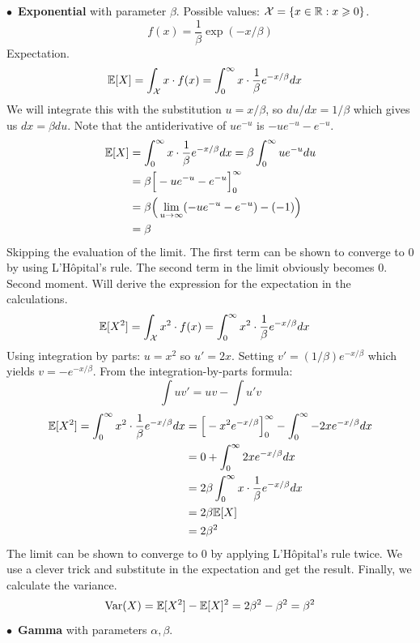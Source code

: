 \newpage\noindent$\bullet$ \textbf{Exponential} with parameter $\beta$. Possible values: $\mathcal{X} = \{x\in\mathbb{R} : x\geqslant0\}$. 
$$
f(x) = \frac{1}{\beta}\exp(-x/\beta)
$$
Expectation.
\begin{align*}
    \mathbb{E}[X] &= \int_{\mathcal{X}} x\cdot f(x) = \int_0^\infty x\cdot \frac{1}{\beta} e^{-x/\beta} dx
\end{align*}
We will integrate this with the substitution $u = x/\beta$, so $du/dx = 1/\beta$ which gives us $dx = \beta du$.
Note that the antiderivative of $ue^{-u}$ is $-ue^{-u} - e^{-u}$.
\begin{align*}
    \mathbb{E}[X] &= \int_0^\infty x\cdot \frac{1}{\beta} e^{-x/\beta} dx
    = \beta\int_0^\infty u e^{-u} du \\
    &= \beta\Big[-ue^{-u} - e^{-u}\Big]_0^\infty \\
    &= \beta\Big(\lim_{u\rightarrow\infty}(-ue^{-u} - e^{-u}) - (- 1)\Big) \\
    &= \beta
\end{align*}
    Skipping the evaluation of the limit. The first term can be shown to converge to 0 by using L'Hôpital's rule.
    The second term in the limit obviously becomes 0.\\
Second moment. Will derive the expression for the expectation in the calculations.
\begin{align*}
    \mathbb{E}[X^2] &= \int_{\mathcal{X}} x^2\cdot f(x) = \int_0^\infty x^2\cdot \frac{1}{\beta} e^{-x/\beta} dx
\end{align*}
Using integration by parts: $u = x^2$ so $u' = 2x$. Setting $v' = (1/\beta)e^{-x/\beta}$ which yields
$v = -e^{-x/\beta}$. From the integration-by-parts formula:
$$
\int uv' = uv - \int u'v
$$
\begin{align*}
    \mathbb{E}[X^2] = \int_0^\infty x^2\cdot \frac{1}{\beta} e^{-x/\beta} dx
    &= \Big[-x^2e^{-x/\beta}\Big]_0^\infty - \int_0^\infty -2x e^{-x/\beta}dx \\
    &= 0 + \int_0^\infty 2x e^{-x/\beta}dx  \\
    &= 2\beta\int_0^\infty x\cdot\frac{1}{\beta}e^{-x/\beta}dx  \\
    &= 2\beta\mathbb{E}[X] \\
    &= 2\beta^2
\end{align*}
The limit can be shown to converge to 0 by applying L'Hôpital's rule twice. We use a clever trick and
substitute in the expectation and get the result. Finally, we calculate the variance.
$$
\text{Var}(X) = \mathbb{E}[X^2] - \mathbb{E}[X]^2 = 2\beta^2 - \beta^2 = \beta^2
$$
\newpage\noindent$\bullet$ \textbf{Gamma} with parameters $\alpha,\beta$.
